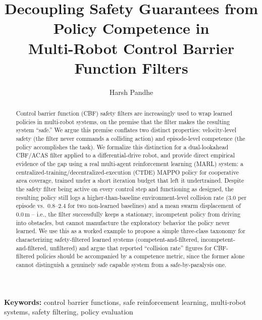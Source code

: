 \documentclass[12pt]{article}
\title{Decoupling Safety Guarantees from Policy Competence in\\
Multi-Robot Control Barrier Function Filters}
\author[1]{Harsh Pandhe}
\affil[1]{Independent Research \\ \texttt{harshpandhehome@gmail.com}}
\date{}
\newcommand{\si}[1]{\mathrm{#1}}
\begin{document}
\maketitle

\begin{abstract}
\noindent
Control barrier function (CBF) safety filters are increasingly used to wrap
learned policies in multi-robot systems, on the premise that the filter makes
the resulting system ``safe.'' We argue this premise conflates two distinct
properties: velocity-level safety (the filter never commands a colliding
action) and episode-level competence (the policy accomplishes the task). We
formalize this distinction for a dual-lookahead CBF/ACAS filter applied to a
differential-drive robot, and provide direct empirical evidence of the gap
using a real multi-agent reinforcement learning (MARL) system: a
centralized-training/decentralized-execution (CTDE) MAPPO policy for
cooperative area coverage, trained under a short iteration budget that left
it undertrained. Despite the safety filter being active on every control step
and functioning as designed, the resulting policy still logs a
higher\hspace{0pt}-\hspace{0pt}than\hspace{0pt}-\hspace{0pt}baseline
environment-level collision rate ($3.0$ per episode vs.\ $0.8$--$2.4$ for two
non-learned baselines) and a mean swarm displacement of $0.0\,\si{m}$ --
i.e., the filter successfully keeps a stationary, incompetent policy from
driving into obstacles, but cannot manufacture the exploratory behavior the
policy never learned. We use this as a worked example to propose a simple
three-class taxonomy for characterizing safety-filtered learned systems
(competent-and-filtered, incompetent-and-filtered, unfiltered) and argue that
reported ``collision rate'' figures for CBF-filtered policies should be
accompanied by a competence metric, since the former alone cannot
distinguish a genuinely safe capable system from a safe-by-paralysis one.
\end{abstract}

\noindent\textbf{Keywords:} control barrier functions, safe reinforcement
learning, multi-robot systems, safety filtering, policy evaluation
\end{document}
